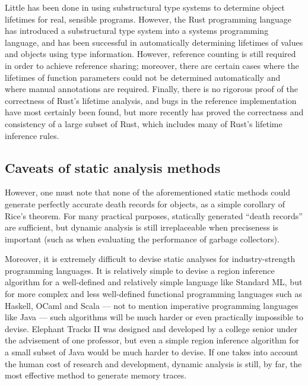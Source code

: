 Little has been done in using substructural type systems to determine object lifetimes for real, sensible programs.
However, the Rust programming language \citep{RustLang} has introduced a substructural type system into a systems
programming language, and has been successful in automatically determining lifetimes of values and objects using
type information. However, reference counting is still required in order to achieve reference sharing; moreover, there are
certain cases where the lifetimes of function parameters could not be determined automatically and where manual
annotations are required. Finally, there is no rigorous proof of the correctness of Rust's lifetime analysis, and bugs in the
reference implementation have most certainly been found, but more recently \cite{RustBelt} has proved the correctness and consistency
of a large subset of Rust, which includes many of Rust's lifetime inference rules.

\subsection{Caveats of static analysis methods}
However, one must note that none of the aforementioned static methods could generate perfectly accurate death records for objects,
as a simple corollary of Rice's theorem. For many practical purposes, statically generated ``death records'' are sufficient, but
dynamic analysis is still irreplaceable when preciseness is important (such as when evaluating the performance of garbage collectors).

Moreover, it is extremely difficult to devise static analyses for industry-strength programming languages. It is relatively simple
to devise a region inference algorithm for a well-defined and relatively simple language like Standard ML, but for more complex and
less well-defined functional programming languages such as Haskell, OCaml and Scala --- not to mention imperative programming
languages like Java --- such algorithms will be much harder or even practically impossible to devise. Elephant Tracks II was designed
and developed by a college senior under the advisement of one professor, but even a simple region inference algorithm for a
small subset of Java would be much harder to devise. If one takes into account the human cost of research and development, dynamic
analysis is still, by far, the most effective method to generate memory traces.

